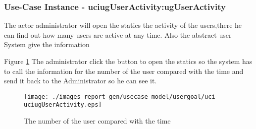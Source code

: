 
	\subsubsection{Use-Case Instance - uciugUserActivity:ugUserActivity}
	
	The actor administrator will open the statics the activity of the users,there he can find out how many users are active at any time. Also the abstract user System give the information		  
	\begin{operationmodel}
	
	\end{operationmodel} 

	
	Figure \ref{fig:lu.uni.lassy.excalibur.examples.icrash-RE-UC-uci-uciugUserActivity}
	The administrator click the button to open the statics so the system has to call the information for the number of the user compared with the time and send it back to the Administrator so he can see it. 
	
	\begin{figure}[htbp]
	\begin{center}
	
	\texttt{[image: ./images-report-gen/usecase-model/usergoal/uci-uciugUserActivity.eps]}
	\end{center}
	\caption[lu.uni.lassy.excalibur.examples.icrash Sequence Diagram: uci-uciugUserActivity]{The number of the user compared with the time}
	\label{fig:lu.uni.lassy.excalibur.examples.icrash-RE-UC-uci-uciugUserActivity}
	\end{figure}
	\vspace{0.5cm}

